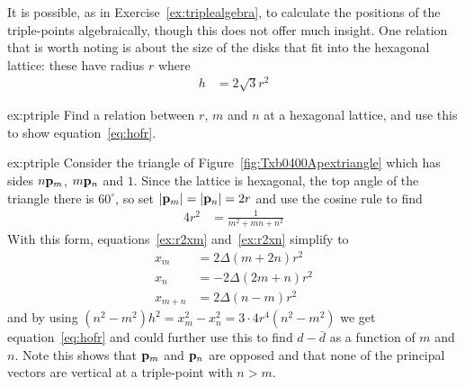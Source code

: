 It is possible, as in Exercise~\ref{ex:triplealgebra}, to calculate the positions of the triple-points algebraically, though this does not offer much insight.
One relation that is worth noting is about the size of the disks that fit into the hexagonal lattice: these 
have radius $r$ where
\begin{align}
	h &= 2\sqrt{3} r^2  \label{eq:hofr}
\end{align}
\begin{jExercise}{ex:ptriple} 
	\label{ex:triplealgebra}
	Find a relation between $r$, $m$ and $n$ at a hexagonal lattice, and use this to show equation~\eqref{eq:hofr}.
\end{jExercise}
\begin{jAnswer}{ex:ptriple}
Consider the triangle of Figure~\ref{fig:Txb0400Apextriangle} which has sides $n{\mathbf p}_{m}$, $m{\mathbf p}_{n}$ and $1$. Since the lattice is hexagonal, the top angle of the triangle there is $60^\circ$, so set $|{\mathbf p}_{m}|=|{\mathbf p}_{n}|=2r$ and use the cosine rule to find   
\begin{align*}
	4 r^2  &=  \frac{1}{m^2+mn + n^2} \label{eq:cosine}
\end{align*}
With this form, equations~\eqref{ex:r2xm} and~\eqref{ex:r2xn} simplify to 
\begin{align*}
	x_m 
	&= 2\Delta(m+2n) r^2
	\\
	x_n &= -2 \Delta (2m+n) r^2
	\\
	x_{m+n} &=  2  \Delta(n-m) r^2
\end{align*}
and by using $(n^2-m^2)h^2=x^2_m-x^2_n=3\cdot 4 r^4 (n^2-m^2)$ we get equation~\eqref{eq:hofr} and could further use this to find $d-\bar{d}$ as a function of $m$ and $n$. Note this shows that ${\mathbf p}_{m}$ and ${\mathbf p}_{n}$ are opposed and that none of the principal vectors are vertical at a triple-point with $n>m$. 
\end{jAnswer} 






